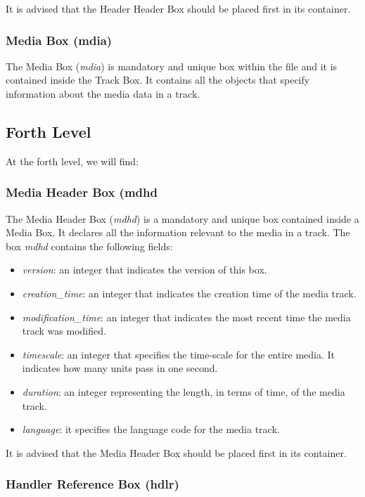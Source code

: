 It is advised that the Header Header Box should be placed first in its container.


\subsubsection*{Media Box (mdia)}

The Media Box (\emph{mdia}) is mandatory and unique box within the file and it is contained inside the Track Box. It contains all the objects that specify information about the media data in a track.

\subsection{Forth Level}

At the forth level, we will find:

\subsubsection*{Media Header Box (mdhd}

The Media Header Box (\emph{mdhd}) is a mandatory and unique box contained inside a Media Box. It declares all the information relevant to the media in a track. The box \emph{mdhd} contains the following fields:

\begin{itemize}
\item \emph{version}: an integer that indicates the version of this box.
\item \emph{creation\_time}: an integer that indicates the creation time of the media track.
\item \emph{modification\_time}: an integer that indicates the most recent time the media track was modified.
\item \emph{timescale}: an integer that specifies the time-scale for the entire media. It indicates how many units pass in one second.
\item \emph{duration}: an integer representing the length, in terms of time, of the media track.
\item \emph{language}: it specifies the language code for the media track.
\end{itemize}

It is advised that the Media Header Box should be placed first in its container.

\subsubsection*{Handler Reference Box (hdlr)}

